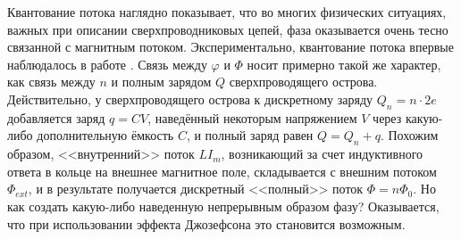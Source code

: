 Квантование потока наглядно показывает, что во многих физических ситуациях, важных при описании сверхпроводниковых цепей, фаза оказывается очень тесно связанной с магнитным потоком. Экспериментально, квантование потока впервые наблюдалось в работе \cite{FluxQuant}.  Связь между $\varphi$ и $\Phi$ носит примерно такой же характер, как связь между $n$ и полным зарядом $Q$ сверхпроводящего острова. Действительно, у сверхпроводящего острова к дискретному заряду $Q_n \!=\! n\cdot2e$ добавляется заряд $q\! = \!CV$, наведённый некоторым напряжением $V$ через какую-либо дополнительную ёмкость $C$, и полный заряд равен $Q\!=\!Q_n\!+\!q$. Похожим образом, <<внутренний>> поток $LI_m$, возникающий за счет индуктивного ответа в кольце на внешнее магнитное поле, складывается с внешним потоком $\Phi_{ext}$, и в результате получается дискретный <<полный>> поток $\Phi\!=\!n\Phi_0$. Но как создать какую-либо наведенную непрерывным образом фазу? Оказывается, что при использовании эффекта Джозефсона это становится возможным.
